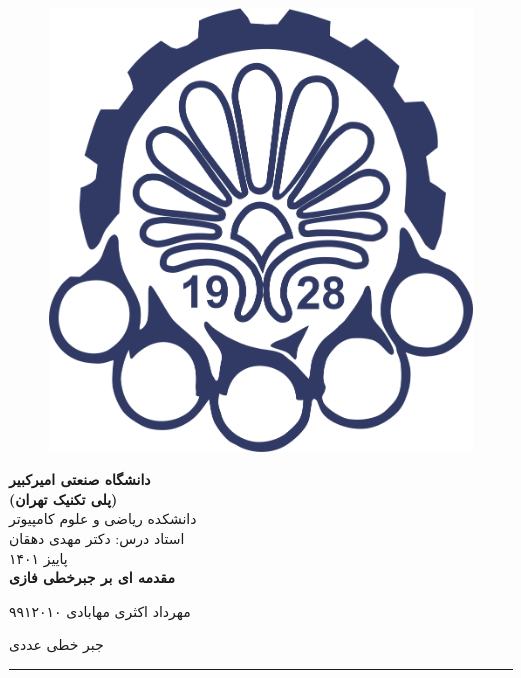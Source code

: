 
	\begin{figure}[t]
		\centering
		\includegraphics[width=0.6\linewidth]{assets/logo.png}
	\end{figure}

	\begin{center}

	\textbf{\huge{ دانشگاه صنعتی امیرکبیر }}
	\\
	
	\textbf{\large{ (پلی تکنیک تهران) }}
	\\[30pt]
	
	\Large{ دانشکده ریاضی و علوم کامپیوتر }
	\\
	{\large استاد درس: دکتر مهدی دهقان}
	\\
	پاییز ۱۴۰۱
	\\[30pt]

	\textbf{\Huge مقدمه ای بر جبرخطی فازی} 
	\\[50pt]
	
	\end{center}
	مهرداد اکثری مهابادی 
	\hfill
	۹۹۱۲۰۱۰
	
	\hfill 
	جبر خطی عددی
	\rule[0pt]{\linewidth}{1pt}
	
	\pagebreak
	
	\tableofcontents
	
	